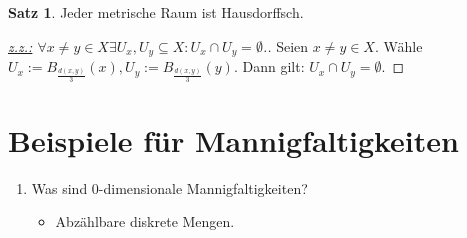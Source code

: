 \documentclass[a4paper,11pt,notitlepage]{report}
\theoremstyle{definition}
\newtheorem{theorem}{Satz}[chapter]
\begin{document}
\begin{theorem}
Jeder metrische Raum ist Hausdorffsch.
\end{theorem}

\begin{proof}
[\underline{z.z.:} $\forall x\neq y \in X \exists U_x, U_y \subseteq X \colon U_x \cap U_y = \emptyset$.]
Seien $x\neq y \in X$. Wähle $U_x := B_\frac{d(x,y)}{3}(x), U_y := B_\frac{d(x,y)}{3}(y)$.
\newline
Dann gilt: $U_x \cap U_y = \emptyset$.
\end{proof}

\section{Beispiele für Mannigfaltigkeiten}
\begin{enumerate}
	\item Was sind 0-dimensionale Mannigfaltigkeiten?
		\begin{itemize}
			\item Abzählbare diskrete Mengen.
		\end{itemize}
		

\end{enumerate}
\end{document}
